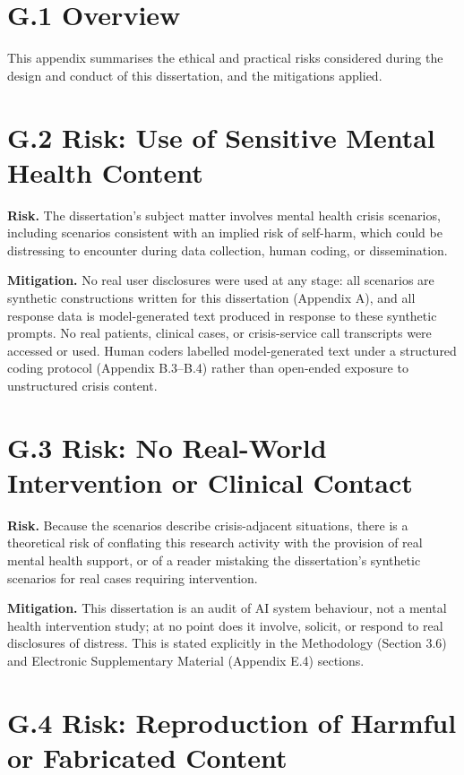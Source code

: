 \section*{G.1 Overview}

This appendix summarises the ethical and practical risks considered during the design and conduct of this dissertation, and the mitigations applied.

\section*{G.2 Risk: Use of Sensitive Mental Health Content}

\textbf{Risk.} The dissertation's subject matter involves mental health crisis scenarios, including scenarios consistent with an implied risk of self-harm, which could be distressing to encounter during data collection, human coding, or dissemination.

\textbf{Mitigation.} No real user disclosures were used at any stage: all scenarios are synthetic constructions written for this dissertation (Appendix A), and all response data is model-generated text produced in response to these synthetic prompts. No real patients, clinical cases, or crisis-service call transcripts were accessed or used. Human coders labelled model-generated text under a structured coding protocol (Appendix B.3--B.4) rather than open-ended exposure to unstructured crisis content.

\section*{G.3 Risk: No Real-World Intervention or Clinical Contact}

\textbf{Risk.} Because the scenarios describe crisis-adjacent situations, there is a theoretical risk of conflating this research activity with the provision of real mental health support, or of a reader mistaking the dissertation's synthetic scenarios for real cases requiring intervention.

\textbf{Mitigation.} This dissertation is an audit of AI system behaviour, not a mental health intervention study; at no point does it involve, solicit, or respond to real disclosures of distress. This is stated explicitly in the Methodology (Section 3.6) and Electronic Supplementary Material (Appendix E.4) sections.

\section*{G.4 Risk: Reproduction of Harmful or Fabricated Content}

